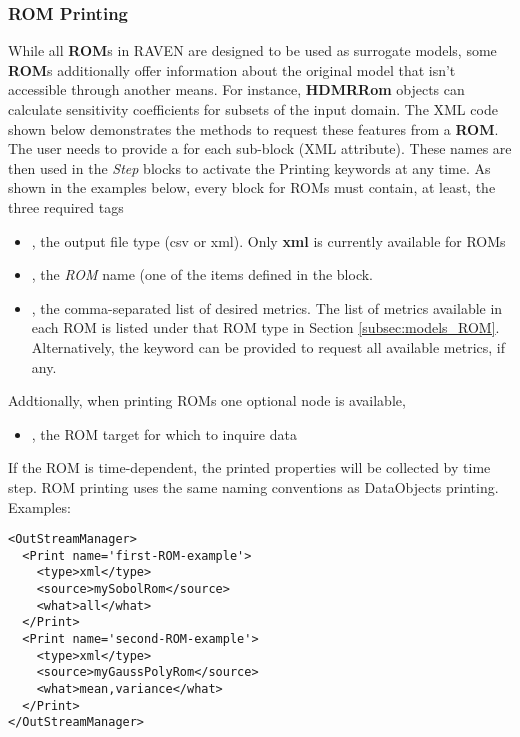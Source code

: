 \subsubsection{\textbf{ROM} Printing}
While all \textbf{ROM}s in RAVEN are designed to be used as surrogate models,
some \textbf{ROM}s additionally offer information about the original model that
isn't accessible through another means.  For instance, \textbf{HDMRRom} objects
can calculate sensitivity coefficients for subsets of the input domain.
%
The XML code shown below demonstrates the methods to request these features
from a \textbf{ROM}.
%
The user needs to provide a  for each sub-block (XML attribute).
%
These names are then used in the \textit{Step} blocks to activate the Printing keywords
at any time.
%
As shown in the examples below, every  block for ROMs must contain, at least, the
three required tags
\vspace{-5mm}
\begin{itemize}
  \itemsep0em
  \item {}, the output file type (csv or xml).
  \nb Only \textbf{xml} is currently available for ROMs
  \item {}, the \textit{ROM} name (one of the  items
  defined in the  block.
  \item {}, the comma-separated list of desired metrics.
  The list of metrics available in each ROM is listed under that ROM
  type in Section \ref{subsec:models_ROM}.  Alternatively, the
  keyword  can be provided to request all available metrics, if any.
\end{itemize}
\vspace{-5mm}
Addtionally, when printing ROMs one optional node is available,
\vspace{-5mm}
\begin{itemize}
  \itemsep0em
  \item {}, the ROM target for which to inquire data

\end{itemize}
\vspace{-5mm}
If the ROM is time-dependent, the printed properties will be collected by time step.
ROM printing uses the same naming conventions as DataObjects printing.
Examples:
\begin{lstlisting}[style=XML]
<OutStreamManager>
  <Print name='first-ROM-example'>
    <type>xml</type>
    <source>mySobolRom</source>
    <what>all</what>
  </Print>
  <Print name='second-ROM-example'>
    <type>xml</type>
    <source>myGaussPolyRom</source>
    <what>mean,variance</what>
  </Print>
</OutStreamManager>
\end{lstlisting}
%
%
